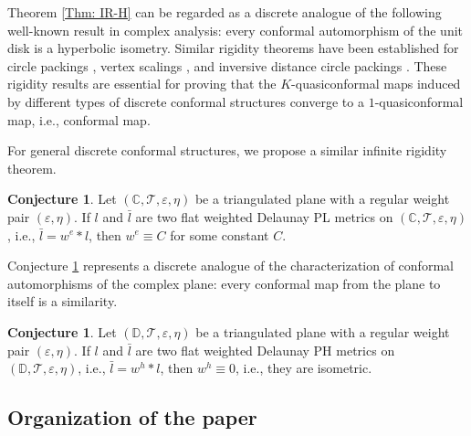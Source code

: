 \documentclass[12pt]{amsart}
\theoremstyle{definition}
\newtheorem{conjecture}[theorem]{Conjecture}
\begin{document}

Theorem \ref{Thm: IR-H} can be regarded as a discrete analogue of the following well-known result in complex analysis: every conformal automorphism of the unit disk is a hyperbolic isometry.
Similar rigidity theorems have been established for circle packings \cite{RS, He1991, Sch, He, HS1993, HS1995, HS1996}, vertex scalings \cite{WGS, LSW, DGM, Dai-Wu}, and inversive distance circle packings \cite{LXZ}.
These rigidity results are essential for proving that the $K$-quasiconformal maps induced by different types of discrete conformal structures converge to a $1$-quasiconformal map, i.e., conformal map.

For general discrete conformal structures, we propose a similar infinite rigidity theorem.
\begin{conjecture}\label{Conjecture Euclidean}
Let $(\mathbb{C}, \mathcal{T}, \varepsilon, \eta)$ be a triangulated plane with a regular weight pair $(\varepsilon, \eta)$.
If $l$ and $\bar{l}$ are two flat weighted Delaunay PL metrics on $(\mathbb{C}, \mathcal{T}, \varepsilon, \eta)$, i.e., $\bar l=w^e*l$, 
then $w^e \equiv C$ for some constant $C$.
\end{conjecture}

Conjecture \ref{Conjecture Euclidean} represents a discrete analogue of the characterization of conformal automorphisms of the complex plane: every conformal map from the plane to itself is a similarity.

\begin{conjecture}
Let $(\mathbb{D}, \mathcal{T}, \varepsilon, \eta)$ be a triangulated plane with a regular weight pair $(\varepsilon, \eta)$.
If $l$ and $\bar{l}$ are two flat weighted Delaunay PH metrics on $(\mathbb{D}, \mathcal{T}, \varepsilon, \eta)$, i.e., $\bar{l}=w^h*l$,
then $w^h \equiv 0$, i.e., they are isometric.
\end{conjecture}


\subsection{Organization of the paper}
\end{document}
